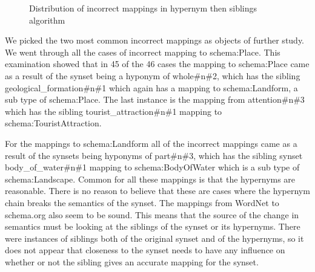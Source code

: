 \begin{figure}[ht]
	\centering
	\caption{Distribution of incorrect mappings in hypernym then siblings algorithm}
	\label{fig:incorrect}
\end{figure}

We picked the two most common incorrect mappings as objects of further study.
We went through all the cases of incorrect mapping to schema:Place.
This examination showed that in 45 of the 46 cases the mapping to schema:Place came as a result of
the synset being a hyponym of whole\#n\#2, which has the sibling geological\_formation\#n\#1 which again has a mapping to
schema:Landform, a sub type of schema:Place.
The last instance is the mapping from attention\#n\#3 which has the sibling tourist\_attraction\#n\#1 mapping to
schema:TouristAttraction.

For the mappings to schema:Landform all of the incorrect mappings came as a result of the synsets being hyponyms of
part\#n\#3, which has the sibling synset body\_of\_water\#n\#1 mapping to schema:BodyOfWater which is a sub type of
schema:Landscape.
Common for all these mappings is that the hypernyms are reasonable.
There is no reason to believe that these are cases where the hypernym chain breaks the semantics of the synset.
The mappings from WordNet to schema.org also seem to be sound.
This means that the source of the change in semantics must be looking at the siblings of the synset or its hypernyms.
There were instances of siblings both of the original synset and of the hypernyms,
so it does not appear that closeness to the synset needs to have any influence on whether or not the sibling gives
an accurate mapping for the synset.


